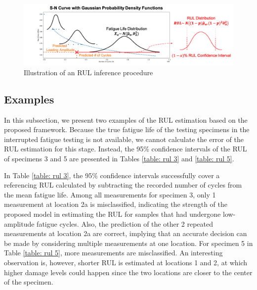 \begin{figure}[tb]
    \includegraphics[width=\linewidth]{fig/rul_inference_procedure.png}
    \caption{Illustration of an RUL inference procedure}
    \label{fig: rul infer procedure}
\end{figure}

\subsection{Examples}

In this subsection, we present two examples of the RUL estimation based on the proposed framework. Because the true fatigue life of the testing specimens in the interrupted fatigue testing is not available, we cannot calculate the error of the RUL estimation for this stage. Instead, the 95\% confidence intervals of the RUL of specimens 3 and 5 are presented in Tables \ref{table: rul 3} and \ref{table: rul 5}. 

In Table \ref{table: rul 3}, the 95\% confidence intervals successfully cover a referencing RUL calculated by subtracting the recorded number of cycles from the mean fatigue life. Among all measurements for specimen 3, only 1 measurement at location 2a is misclassified, indicating the strength of the proposed model in estimating the RUL for samples that had undergone low-amplitude fatigue cycles. Also, the prediction of the other 2 repeated measurements at location 2a are correct, implying that an accurate decision can be made by considering multiple measurements at one location. For specimen 5 in Table \ref{table: rul 5}, more measurements are misclassified. An interesting observation is, however, shorter RUL is estimated at locations 1 and 2, at which higher damage levels could happen since the two locations are closer to the center of the specimen. 

